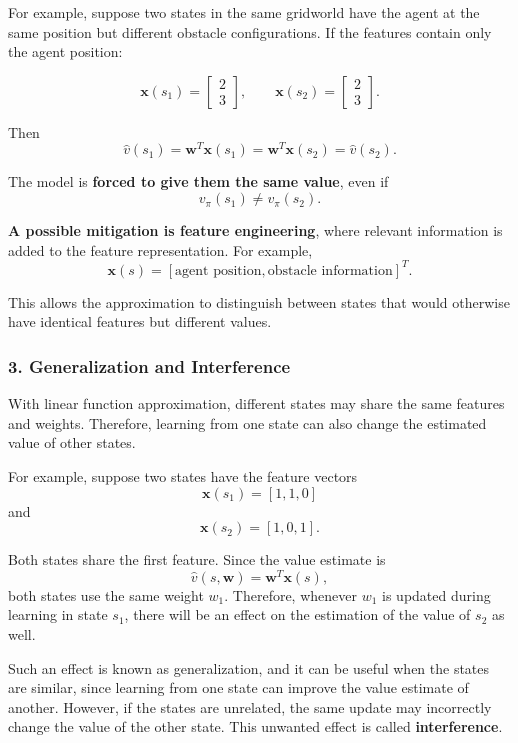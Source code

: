 \documentclass{scrartcl}
\theoremstyle{mytheoremstyle}
\theoremstyle{mytheoremstyle}
\theoremstyle{myproblemstyle}
\begin{document}
For example, suppose two states in the same gridworld have the agent at the same position but different obstacle configurations. If the features  contain only the agent position:

\[
    \mathbf{x}(s_1)=
    \begin{bmatrix}
        2 \\
        3
    \end{bmatrix},
    \qquad
    \mathbf{x}(s_2)=
    \begin{bmatrix}
        2 \\
        3
    \end{bmatrix}.
\]

Then
\[
    \hat v(s_1)
    =
    \mathbf{w}^T\mathbf{x}(s_1)
    =
    \mathbf{w}^T\mathbf{x}(s_2)
    =
    \hat v(s_2).
\]

The model is \textbf{forced to give them the same value}, even if
\[
    v_\pi(s_1)\neq v_\pi(s_2).
\]

\textbf{A possible mitigation is feature engineering}, where relevant information is added to the feature representation. For example,
\[
    \mathbf{x}(s)=
    [\text{agent position},\text{obstacle information}]^T.
\]

This allows the approximation to distinguish between states that would otherwise have identical features but different values.
\subsubsection*{3. Generalization and Interference}

With linear function approximation, different states may share the same features and weights. Therefore, learning from one state can also change the estimated value of other states.

For example, suppose two states have the feature vectors
\[
    \mathbf{x}(s_1)=[1,1,0]
\]
and
\[
    \mathbf{x}(s_2)=[1,0,1].
\]

Both states share the first feature. Since the value estimate is
\[
    \hat v(s,\mathbf w)=\mathbf w^T\mathbf x(s),
\]
both states use the same weight $w_1$. Therefore, whenever $w_1$ is updated during learning in state $s_1$, there will be an effect on the estimation of the value of $s_2$ as well.

Such an effect is known as generalization, and it can be useful when the states are similar, since learning from one state can improve the value estimate of another. However, if the states are unrelated, the same update may incorrectly change the value of the other state. This unwanted effect is called \textbf{interference}.
\end{document}
